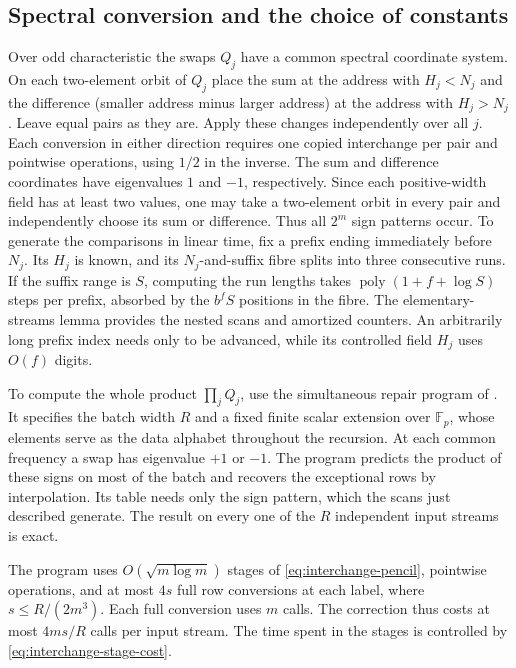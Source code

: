 \subsection{Spectral conversion and the choice of constants}
\label{subsec:swap-spectrum}

Over odd characteristic the swaps $Q_j$ have a common spectral
coordinate system. On each two-element orbit of $Q_j$ place the sum
at the address with $H_j<N_j$ and the difference (smaller address
minus larger address) at the address with $H_j>N_j$. Leave equal
pairs as they are. Apply these changes independently over all $j$.
Each conversion in either direction requires one copied interchange
per pair and pointwise operations, using $1/2$ in the inverse. The
sum and difference coordinates have eigenvalues $1$ and $-1$,
respectively. Since each positive-width field has at least two values,
one may take a two-element orbit in every pair and independently
choose its sum or difference. Thus all $2^m$ sign patterns occur.
To generate the comparisons in linear time,
fix a prefix ending immediately before $N_j$. Its $H_j$ is known,
and its $N_j$-and-suffix fibre splits into three consecutive runs.
If the suffix range is $S$, computing the run lengths takes
$\operatorname{poly}(1+f+\log S)$ steps per prefix, absorbed by the
$b^f S$ positions in the fibre. The elementary-streams lemma provides
the nested scans and amortized counters. An arbitrarily long prefix
index needs only to be advanced, while its controlled field $H_j$
uses $O(f)$ digits.


To compute the whole product $\prod_j Q_j$, use the simultaneous repair
program of \cite[Theorem~ and
Corollary~]{oaF}. It specifies the batch width
$R$ and a fixed finite scalar extension over $\mathbb F_p$, whose
elements serve as the data alphabet throughout the recursion. At
each common frequency a swap has eigenvalue $+1$ or $-1$. The
program predicts the product of these signs on most of the batch and
recovers the exceptional rows by interpolation. Its table needs only
the sign pattern, which the scans just described generate. The result
on every one of the $R$ independent input streams is exact.

The program uses $O(\sqrt{m\log m})$ stages of
\eqref{eq:interchange-pencil}, pointwise operations, and at most $4s$
full row conversions at each label, where $s\le R/(2m^3)$. Each full
conversion uses $m$ calls. The correction thus costs at most $4ms/R$
calls per input stream. The time spent in the stages is controlled by
\eqref{eq:interchange-stage-cost}.

